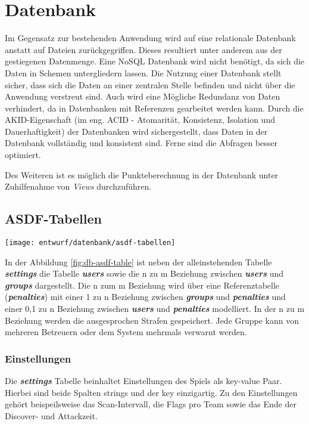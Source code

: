 \section{Datenbank}
Im Gegensatz zur bestehenden Anwendung wird auf eine relationale Datenbank anstatt auf Dateien zurückgegriffen. Dieses resultiert unter anderem aus der gestiegenen Datenmenge. Eine NoSQL Datenbank wird nicht benötigt, da sich die Daten in Schemen untergliedern lassen. Die Nutzung einer Datenbank stellt sicher, dass sich die Daten an einer zentralen Stelle befinden und nicht über die Anwendung verstreut sind. Auch wird eine Mögliche Redundanz von Daten verhindert, da in Datenbanken mit Referenzen gearbeitet werden kann. Durch die AKID-Eigenschaft (im eng. ACID - Atomarität, Konsistenz, Isolation und Dauerhaftigkeit) der Datenbanken wird sichergestellt, dass Daten in der Datenbank vollständig und konsistent sind. Ferne sind die Abfragen besser optimiert.

Des Weiteren ist es möglich die Punkteberechnung in der Datenbank unter Zuhilfenahme von \textit{Views} durchzuführen.

\subsection{ASDF-Tabellen}
\begin{center}
	\texttt{[image: entwurf/datenbank/asdf-tabellen]}
	\label{fig:db-asdf-table}
\end{center}

In der Abbildung \ref{fig:db-asdf-table} ist neben der alleinstehenden Tabelle \textbf{\textit{settings}} die Tabelle \textbf{\textit{users}} sowie die n zu m Beziehung zwischen \textbf{\textit{users}} und \textbf{\textit{groups}} dargestellt. Die n zum m Beziehung wird über eine Referenztabelle (\textbf{\textit{penalties}}) mit einer 1 zu n Beziehung zwischen \textbf{\textit{groups}} und \textbf{\textit{penalties}} und einer 0,1 zu n Beziehung zwischen \textbf{\textit{users}} und \textbf{\textit{penalties}} modelliert. In der n zu m Beziehung werden die ausgesprochen Strafen gespeichert. Jede Gruppe kann von mehreren Betreuern oder dem System mehrmals verwarnt werden.

\subsubsection{Einstellungen}
Die \textbf{\textit{settings}} Tabelle beinhaltet Einstellungen des Spiels als key-value Paar. Hierbei sind beide Spalten strings und der key einzigartig. Zu den Einstellungen gehört beispeilsweise das Scan-Intervall, die Flags pro Team sowie das Ende der Discover- und Attackzeit.

